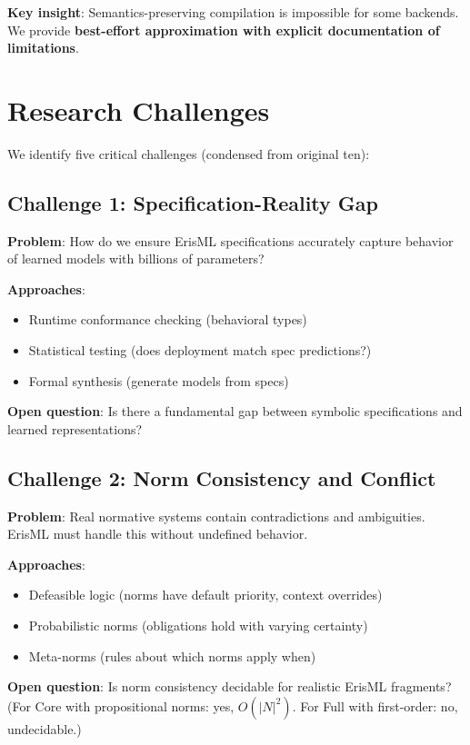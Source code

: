 \documentclass[conference]{IEEEtran}
\begin{document}
\textbf{Key insight}: Semantics-preserving compilation is impossible for
some backends. We provide \textbf{best-effort approximation with
explicit documentation of limitations}.

\section{Research Challenges}
\label{sec:challenges}

We identify five critical challenges (condensed from original ten):

\subsection{Challenge 1: Specification-Reality Gap}

\textbf{Problem}: How do we ensure ErisML specifications accurately
capture behavior of learned models with billions of parameters?

\textbf{Approaches}:
\begin{itemize}
\item Runtime conformance checking (behavioral types)
\item Statistical testing (does deployment match spec predictions?)
\item Formal synthesis (generate models from specs)
\end{itemize}

\textbf{Open question}: Is there a fundamental gap between symbolic
specifications and learned representations?

\subsection{Challenge 2: Norm Consistency and Conflict}

\textbf{Problem}: Real normative systems contain contradictions and
ambiguities. ErisML must handle this without undefined behavior.

\textbf{Approaches}:
\begin{itemize}
\item Defeasible logic (norms have default priority, context overrides)
\item Probabilistic norms (obligations hold with varying certainty)
\item Meta-norms (rules about which norms apply when)
\end{itemize}

\textbf{Open question}: Is norm consistency decidable for realistic
ErisML fragments? (For Core with propositional norms: yes,
$O(|N|^2)$. For Full with first-order: no, undecidable.)
\end{document}
